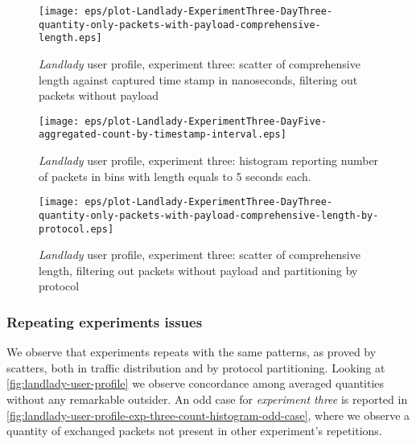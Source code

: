 \documentclass[10pt,a4paper]{article}
\begin{document}
    \begin{figure}
      \centering
      \texttt{[image: eps/plot-Landlady-ExperimentThree-DayThree-quantity-only-packets-with-payload-comprehensive-length.eps]}
      \caption{\emph{Landlady} user profile, experiment three: scatter
        of comprehensive length against captured time stamp in
        nanoseconds, filtering out packets without payload}
      \label{fig:landlady-user-profile-exp-three-comprehensive-length-scatter-filtering-on-payload}
    \end{figure}
    
    \begin{figure}
      \centering
      \texttt{[image: eps/plot-Landlady-ExperimentThree-DayFive-aggregated-count-by-timestamp-interval.eps]}
      \caption{\emph{Landlady} user profile, experiment three: histogram
        reporting number of packets in bins with length equals to 5
        seconds each.}
      \label{fig:landlady-user-profile-exp-three-count-histogram}
    \end{figure}

    \begin{figure}
      \centering
      \texttt{[image: eps/plot-Landlady-ExperimentThree-DayThree-quantity-only-packets-with-payload-comprehensive-length-by-protocol.eps]}
      \caption{\emph{Landlady} user profile, experiment three: scatter
        of comprehensive length, filtering out packets without payload
        and partitioning by protocol}
      \label{fig:landlady-user-profile-exp-three-comprehensive-length-by-protocol}
    \end{figure}



    \subsubsection*{Repeating experiments issues}
    
    We observe that experiments repeats with the same patterns, as
    proved by scatters, both in traffic distribution and by protocol
    partitioning. Looking at \autoref{fig:landlady-user-profile} we
    observe concordance among averaged quantities without any
    remarkable outsider. An odd case for \emph{experiment three} is
    reported in
    \autoref{fig:landlady-user-profile-exp-three-count-histogram-odd-case},
    where we observe a quantity of exchanged packets not present in
    other experiment's repetitions.
\end{document}
